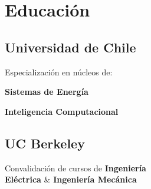 \section{Educación \faGraduationCap{}}

\subsection{Universidad de Chile}
Especialización en núcleos de:
\vspace{\topsep} 
\begin{tightemize}
\item \textbf{Sistemas de Energía}
\item \textbf{Inteligencia Computacional}
\end{tightemize}
\sectionsep

\subsection{UC Berkeley}
Convalidación de cursos de \textbf{Ingeniería\\ Eléctrica} \& \textbf{Ingeniería Mecánica}
\sectionsep


